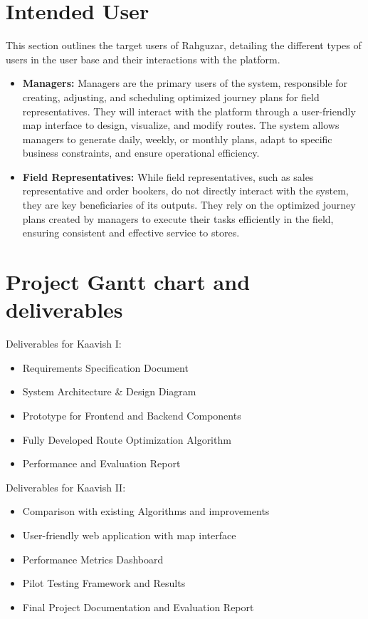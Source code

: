 \section{Intended User}

This section outlines the target users of Rahguzar, detailing the different types of users in the user base and their interactions with the platform.
\begin{itemize}

         \item \textbf{Managers:} Managers are the primary users of the system, responsible for creating, adjusting, and scheduling optimized journey plans for field representatives. They will interact with the platform through a user-friendly map interface to design, visualize, and modify routes. The system allows managers to generate daily, weekly, or monthly plans, adapt to specific business constraints, and ensure operational efficiency.
         \item \textbf{Field Representatives:} While field representatives, such as sales representative and order bookers, do not directly interact with the system, they are key beneficiaries of its outputs. They rely on the optimized journey plans created by managers to execute their tasks efficiently in the field, ensuring consistent and effective service to stores.

\end{itemize}


\section{Project Gantt chart and deliverables}

Deliverables for Kaavish I:
\begin{itemize}
    \item Requirements Specification Document
    \item System Architecture \& Design Diagram
    \item Prototype for Frontend and Backend Components
    \item Fully Developed Route Optimization Algorithm
    \item Performance and Evaluation Report
\end{itemize}
Deliverables for Kaavish II:
\begin{itemize}
    \item Comparison with existing Algorithms and improvements
    \item User-friendly web application with map interface
    \item Performance Metrics Dashboard
    \item Pilot Testing Framework and Results
    \item Final Project Documentation and Evaluation Report
\end{itemize}



